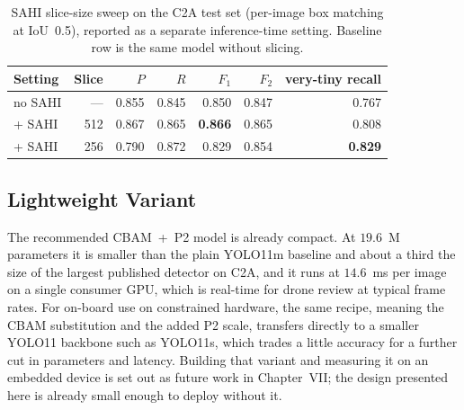 \begin{table}[tbp]
  \centering
  \caption{SAHI slice-size sweep on the C2A test set (per-image box matching at
  IoU~0.5), reported as a separate inference-time setting. Baseline row is the
  same model without slicing.}
  \label{tab:sahi}
  \begin{tabular}{@{}l r r r r r r@{}}
    \toprule
    Setting & Slice & $P$ & $R$ & $F_1$ & $F_2$ & very-tiny recall \\
    \midrule
    no SAHI  & ---  & 0.855 & 0.845 & 0.850 & 0.847 & 0.767 \\
    + SAHI   & 512  & 0.867 & 0.865 & \textbf{0.866} & 0.865 & 0.808 \\
    + SAHI   & 256  & 0.790 & 0.872 & 0.829 & 0.854 & \textbf{0.829} \\
    \bottomrule
  \end{tabular}
\end{table}

\subsection{Lightweight Variant}
\label{sec:lightweight}
The recommended CBAM~+~P2 model is already compact. At $19.6$~M parameters it is
smaller than the plain YOLO11m baseline and about a third the size of the largest
published detector on C2A, and it runs at $14.6$~ms per image on a single consumer
GPU, which is real-time for drone review at typical frame rates. For on-board use on
constrained hardware, the same recipe, meaning the CBAM substitution and the added
P2 scale, transfers directly to a smaller YOLO11 backbone such as YOLO11s, which
trades a little accuracy for a further cut in parameters and latency. Building that
variant and measuring it on an embedded device is set out as future work in
Chapter~VII; the design presented here is already small enough to deploy without it.

